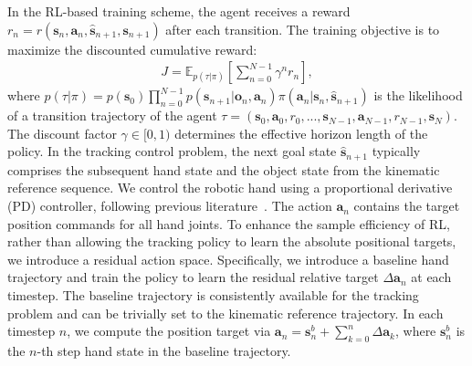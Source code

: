In the RL-based training scheme, the agent receives a reward \(r_{n} = r({\mathbf{s}}_n, \mathbf{a}_n, \hat{\mathbf{s}}_{n+1}, \mathbf{s}_{n+1})\) after each transition. The training objective is to maximize the discounted cumulative reward:
\begin{align}
    J = \mathbb{E}_{p(\tau\vert \pi)} \left[  \sum_{n=0}^{N-1} \gamma^{n}r_n  \right],
\end{align}
where \(p(\tau\vert \pi) = p({\mathbf{s}}_0) \prod_{n=0}^{N-1} p(\mathbf{s}_{n+1}\vert \mathbf{o}_n, \mathbf{a}_n)\pi(\mathbf{a}_n\vert \mathbf{s}_n,\hat{\mathbf{s}}_{n+1})\) is the likelihood of a transition trajectory of the agent \(\tau = (\mathbf{s}_0,\mathbf{a}_0,r_0,...,\mathbf{s}_{N-1},\mathbf{a}_{N-1},r_{N-1}, \mathbf{s}_N)\). The discount factor \(\gamma \in [0,1)\) determines the effective horizon length of the policy.
In the tracking control problem, the next goal state \(\hat{\mathbf{s}}_{n+1}\) typically comprises the subsequent hand state and the object state from the kinematic reference sequence. We control the robotic hand using a proportional derivative (PD) controller, following previous literature~\citep{Luo2024GraspingDO,Luo2023PerpetualHC,christen2022d,zhang2023artigrasp}. The action \(\mathbf{a}_n\) contains the target position commands for all hand joints. 
To enhance the sample efficiency of RL, rather than allowing the tracking policy to learn the absolute positional targets, we introduce a residual action space. Specifically, we introduce a baseline hand trajectory and train the policy to learn the residual relative target \(\Delta\mathbf{a}_n\) at each timestep. The baseline trajectory is consistently available for the tracking problem and can be trivially set to the kinematic reference trajectory. 
In each timestep $n$, we compute the position target via $\mathbf{a}_n = \mathbf{s}_n^{b} + \sum_{k=0}^{n}\Delta \mathbf{a}_k$, where $\mathbf{s}_n^{b}$ is the $n$-th step hand state in the baseline trajectory. 

